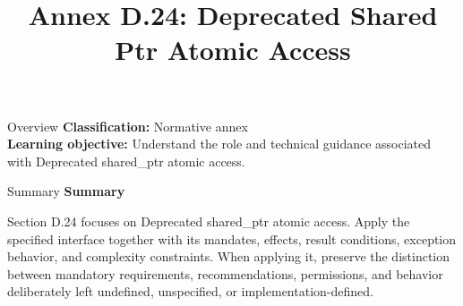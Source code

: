 \documentclass[10pt,letterpaper]{article}
\title{Annex D.24: Deprecated Shared Ptr Atomic Access}
\author{}
\date{}
\begin{document}
\maketitle
\begin{CornellOverviewBox}{Overview}
\textbf{Classification:} Normative annex\\[2pt]
\textbf{Learning objective:} Understand the role and technical guidance associated with Deprecated shared\_ptr atomic access.
\end{CornellOverviewBox}\begin{CornellSummaryBox}{Summary}
{\sffamily\bfseries\color{Accent} Summary}\par\vspace{3pt}Section D.24 focuses on Deprecated shared\_ptr atomic access. Apply the specified interface together with its mandates, effects, result conditions, exception behavior, and complexity constraints. When applying it, preserve the distinction between mandatory requirements, recommendations, permissions, and behavior deliberately left undefined, unspecified, or implementation-defined.
\end{CornellSummaryBox}
\end{document}
